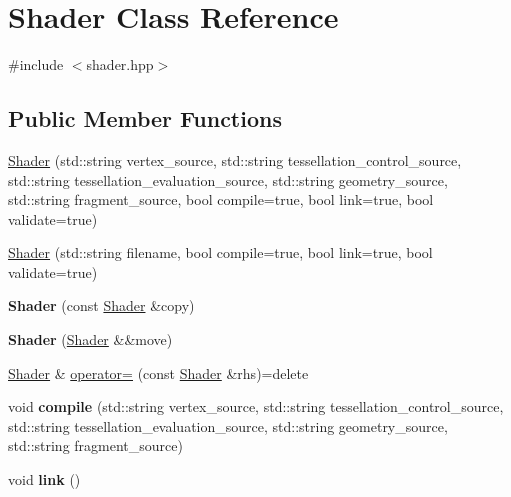 \hypertarget{class_shader}{}\section{Shader Class Reference}
\label{class_shader}


{\ttfamily \#include $<$shader.\+hpp$>$}

\subsection*{Public Member Functions}
\begin{DoxyCompactItemize}
\item 
\mbox{\hyperlink{class_shader_ad70a8439144aba347eea228df7a3357b}{Shader}} (std\+::string vertex\+\_\+source, std\+::string tessellation\+\_\+control\+\_\+source, std\+::string tessellation\+\_\+evaluation\+\_\+source, std\+::string geometry\+\_\+source, std\+::string fragment\+\_\+source, bool compile=true, bool link=true, bool validate=true)
\item 
\mbox{\hyperlink{class_shader_adecfdceb03c6d56bbba99e9f49855a4a}{Shader}} (std\+::string filename, bool compile=true, bool link=true, bool validate=true)
\item 
\mbox{\label{class_shader_a055d46d84b983cd53162a07a1878a5cf}} 
{\bfseries Shader} (const \mbox{\hyperlink{class_shader}{Shader}} \&copy)
\item 
\mbox{\label{class_shader_ad4e6b6f732bb803e8a5b5338ede2e2e7}} 
{\bfseries Shader} (\mbox{\hyperlink{class_shader}{Shader}} \&\&move)
\item 
\mbox{\hyperlink{class_shader}{Shader}} \& \mbox{\hyperlink{class_shader_a4aa4dab7fa6e0cb0dd12df61b471e6f0}{operator=}} (const \mbox{\hyperlink{class_shader}{Shader}} \&rhs)=delete
\item 
\mbox{\label{class_shader_afc1d919ec1b4227bb9fec3010719913e}} 
void {\bfseries compile} (std\+::string vertex\+\_\+source, std\+::string tessellation\+\_\+control\+\_\+source, std\+::string tessellation\+\_\+evaluation\+\_\+source, std\+::string geometry\+\_\+source, std\+::string fragment\+\_\+source)
\item 
\mbox{\label{class_shader_a35e35ddc1d24cae176cc310bd3b7b96f}} 
void {\bfseries link} ()
\item 

\end{DoxyCompactItemize}
